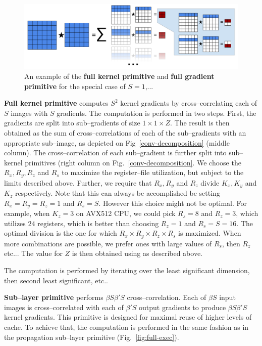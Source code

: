    \begin{figure}
     \centering
     \includegraphics[width=0.99\linewidth]{fig/update2}
     \caption{An example of the {\bf full kernel primitive} and {\bf
         full gradient primitive} for the special case of $S=1$,...}
     \label{fig:conv-decomposition}
   \end{figure}

  {\bf Full kernel primitive} computes $S^2$ kernel gradients by
  cross--correlating each of $S$ images with $S$ gradients.  The
  computation is performed in two steps.  First, the gradients are
  split into sub--gradients of size $1 \times 1 \times Z$.  The result
  is then obtained as the sum of cross--correlations of each of the
  sub--gradients with an appropriate sub--image, as depicted on
  Fig~\ref{conv-decomposition} (middle column).  The
  cross--correlation of each sub--gradient is further split into
  sub--kernel primitives (right column on
  Fig.~\ref{conv-decomposition}.  We choose the $R_x, R_y, R_z$ and
  $R_s$ to maximize the register--file utilization, but subject to the
  limits described above.  Further, we require that $R_x, R_y$ and
  $R_z$ divide $K_x, K_y$ and $K_z$ respectively.  Note that this can
  always be accomplished be setting $R_x=R_y=R_z=1$ and $R_s=S$.
  However this choice might not be optimal.  For example, when $K_z=3$
  on AVX512 CPU, we could pick $R_s=8$ and $R_z=3$, which utilizes
  $24$ registers, which is better than choosing $R_z=1$ and
  $R_s=S=16$.  The optimal division is the one for which $R_x \times
  R_y \times R_z \times R_s$ is maximized.  When more combinations are
  possible, we prefer ones with large values of $R_s$, then $R_z$
  etc...  The value for $Z$ is then obtained using as described above.

  The computation is performed by iterating over the least significant
  dimension, then second least significant, etc..

  {\bf Sub--layer primitive} performs $\beta S \beta' S$
  cross--correlation.  Each of $\beta S$ input images is
  cross--correlated with each of $\beta'S$ output gradients to produce
  $\beta S \beta' S$ kernel gradients.  This primitive is designed for
  maximal reuse of higher levels of cache.  To achieve that, the
  computation is performed in the same fashion as in the propagation
  sub--layer primitive (Fig.~\ref{fig:full-exec}).


